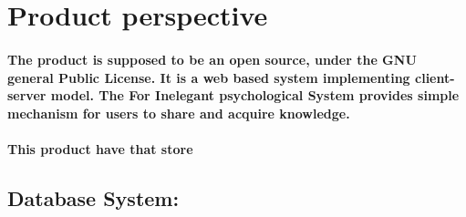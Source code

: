 \documentclass[../Psychological_system_web_application.tex]{subfiles}
\begin{document}
	\section{Product perspective}
			\paragraph{The product is supposed to be an open source, under the GNU general Public License. It is a web based system implementing client-server model. The  For Inelegant psychological System provides simple mechanism for users to share and acquire knowledge.}
			\paragraph{This product have  that store}
				\subsection{ Database System:} 
\end{document}
